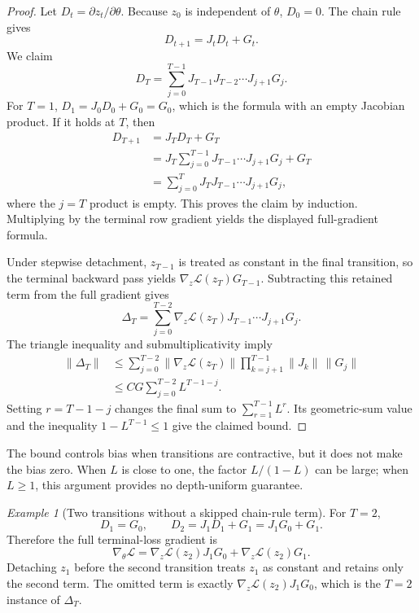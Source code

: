 \documentclass[11pt,oneside]{book}
\theoremstyle{remark}
\newtheorem{example}[definition]{Example}
\begin{document}
\begin{proof}
Let $D_t=\partial z_t/\partial\theta$. Because $z_0$ is independent of
$\theta$, $D_0=0$. The chain rule gives
\[
D_{t+1}=J_tD_t+G_t.
\]
We claim
\[
D_T=\sum_{j=0}^{T-1}J_{T-1}J_{T-2}\cdots J_{j+1}G_j.
\]
For $T=1$, $D_1=J_0D_0+G_0=G_0$, which is the formula with an empty
Jacobian product. If it holds at $T$, then
\[
\begin{aligned}
D_{T+1}
&=J_TD_T+G_T\\
&=J_T\sum_{j=0}^{T-1}
J_{T-1}\cdots J_{j+1}G_j+G_T\\
&=\sum_{j=0}^{T}
J_TJ_{T-1}\cdots J_{j+1}G_j,
\end{aligned}
\]
where the $j=T$ product is empty. This proves the claim by induction.
Multiplying by the terminal row gradient yields the displayed full-gradient
formula.

Under stepwise detachment, $z_{T-1}$ is treated as constant in the final
transition, so the terminal backward pass yields
$\nabla_z\mathcal L(z_T)G_{T-1}$. Subtracting this retained term from the full
gradient gives
\[
\Delta_T=\sum_{j=0}^{T-2}
\nabla_z\mathcal L(z_T)J_{T-1}\cdots J_{j+1}G_j.
\]
The triangle inequality and submultiplicativity imply
\[
\begin{aligned}
\|\Delta_T\|
&\le\sum_{j=0}^{T-2}
\|\nabla_z\mathcal L(z_T)\|
\prod_{k=j+1}^{T-1}\|J_k\|\,\|G_j\|\\
&\le CG\sum_{j=0}^{T-2}L^{T-1-j}.
\end{aligned}
\]
Setting $r=T-1-j$ changes the final sum to
$\sum_{r=1}^{T-1}L^r$. Its geometric-sum value and the inequality
$1-L^{T-1}\le1$ give the claimed bound.
\end{proof}

The bound controls bias when transitions are contractive, but it does not
make the bias zero. When $L$ is close to one, the factor $L/(1-L)$ can be
large; when $L\ge1$, this argument provides no depth-uniform guarantee.

\begin{example}[Two transitions without a skipped chain-rule term]
For $T=2$,
\[
D_1=G_0,
\qquad
D_2=J_1D_1+G_1=J_1G_0+G_1.
\]
Therefore the full terminal-loss gradient is
\[
\nabla_\theta\mathcal L
=\nabla_z\mathcal L(z_2)J_1G_0
+\nabla_z\mathcal L(z_2)G_1.
\]
Detaching $z_1$ before the second transition treats $z_1$ as constant and
retains only the second term. The omitted term is exactly
$\nabla_z\mathcal L(z_2)J_1G_0$, which is the $T=2$ instance of
$\Delta_T$.
\end{example}
\end{document}
